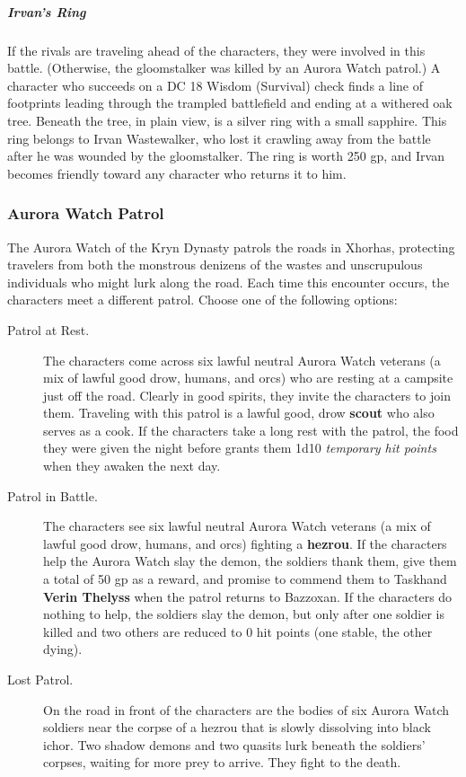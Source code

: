 \documentclass[10pt,a4paper,twoside,bg=print,twocolumn,openany,nodeprecatedcode]{dndbook}
\begin{document}
\subparagraph{Irvan's Ring}
If the rivals are traveling ahead of the characters, they were involved in this battle. (Otherwise, the gloomstalker was killed by an Aurora Watch patrol.) A character who succeeds on a DC 18 Wisdom (Survival) check finds a line of footprints leading through the trampled battlefield and ending at a withered oak tree. Beneath the tree, in plain view, is a silver ring with a small sapphire. This ring belongs to Irvan Wastewalker, who lost it crawling away from the battle after he was wounded by the gloomstalker. The ring is worth 250 gp, and Irvan becomes friendly toward any character who returns it to him.

\subsubsection{Aurora Watch Patrol}
The Aurora Watch of the Kryn Dynasty patrols the roads in Xhorhas, protecting travelers from both the monstrous denizens of the wastes and unscrupulous individuals who might lurk along the road. Each time this encounter occurs, the characters meet a different patrol. Choose one of the following options:


\begin{description}
\item[Patrol at Rest.]
The characters come across six lawful neutral Aurora Watch veterans (a mix of lawful good drow, humans, and orcs) who are resting at a campsite just off the road. Clearly in good spirits, they invite the characters to join them. Traveling with this patrol is a lawful good, drow \textbf{scout} who also serves as a cook. If the characters take a long rest with the patrol, the food they were given the night before grants them 1d10 \textit{temporary hit points} when they awaken the next day.
\item[Patrol in Battle.]
The characters see six lawful neutral Aurora Watch veterans (a mix of lawful good drow, humans, and orcs) fighting a \textbf{hezrou}. If the characters help the Aurora Watch slay the demon, the soldiers thank them, give them a total of 50 gp as a reward, and promise to commend them to Taskhand \textbf{Verin Thelyss} when the patrol returns to Bazzoxan. If the characters do nothing to help, the soldiers slay the demon, but only after one soldier is killed and two others are reduced to 0 hit points (one stable, the other dying).
\item[Lost Patrol.]
On the road in front of the characters are the bodies of six Aurora Watch soldiers near the corpse of a hezrou that is slowly dissolving into black ichor. Two shadow demons and two quasits lurk beneath the soldiers' corpses, waiting for more prey to arrive. They fight to the death.
\end{description}
\end{document}
